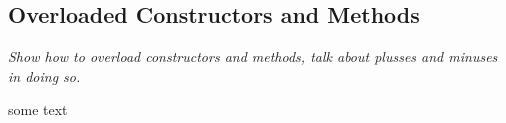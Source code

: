 \subsection{Overloaded Constructors and Methods}
\textit{Show how to overload constructors and methods, talk about plusses and minuses in doing so.}

some text